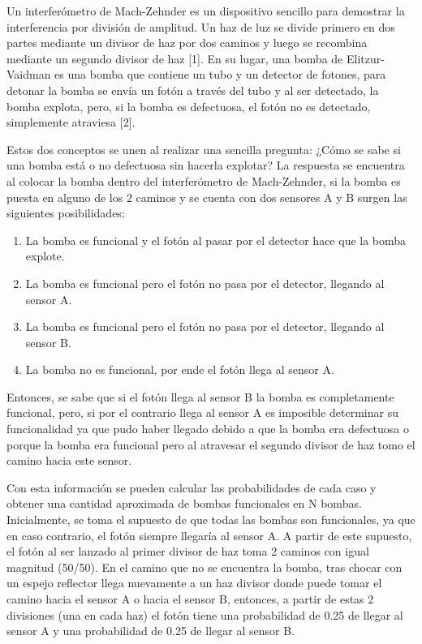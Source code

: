 \documentclass[conference]{IEEEtran}
\begin{document}
Un interferómetro de Mach-Zehnder es un dispositivo sencillo para demostrar la interferencia por división de amplitud. Un haz de luz se divide primero en dos partes 
mediante un divisor de haz por dos caminos y luego se recombina mediante un segundo divisor de haz [1]. En su lugar, una bomba de Elitzur-Vaidman es una bomba que contiene un tubo y 
un detector de fotones, para detonar la bomba se envía un fotón a través del tubo y al ser detectado, la bomba explota, pero, si la bomba es defectuosa, el fotón no es
detectado, simplemente atraviesa [2].

Estos dos conceptos se unen al realizar una sencilla pregunta: ¿Cómo se sabe si una bomba está o no defectuosa sin hacerla explotar? La respuesta se encuentra
al colocar la bomba dentro del interferómetro de Mach-Zehnder, si la bomba es puesta en alguno de los 2 caminos y se cuenta con dos sensores A y B surgen las siguientes posibilidades:
\begin{enumerate}
    \item La bomba es funcional y el fotón al pasar por el detector hace que la bomba explote.
    \item La bomba es funcional pero el fotón no pasa por el detector, llegando al sensor A.
    \item La bomba es funcional pero el fotón no pasa por el detector, llegando al sensor B.
    \item La bomba no es funcional, por ende el fotón llega al sensor A.
\end{enumerate}
Entonces, se sabe que si el fotón llega al sensor B la bomba es completamente funcional, pero, si por el contrario llega al sensor A es imposible determinar su funcionalidad
ya que pudo haber llegado debido a que la bomba era defectuosa o porque la bomba era funcional pero al atravesar el segundo divisor de haz tomo el camino
hacia este sensor.

Con esta información se pueden calcular las probabilidades de cada caso y obtener una cantidad aproximada de bombas funcionales en N bombas. Inicialmente, se toma el supuesto
de que todas las bombas son funcionales, ya que en caso contrario, el fotón siempre llegaría al sensor A. A partir de este supuesto, el fotón al ser lanzado al primer divisor de haz
toma 2 caminos con igual magnitud (50/50). En el camino que no se encuentra la bomba, tras chocar con un espejo reflector llega nuevamente a un haz divisor donde puede tomar el camino
hacia el sensor A o hacia el sensor B, entonces, a partir de estas 2 divisiones (una en cada haz) el fotón tiene una probabilidad de 0.25 de llegar al sensor A y una probabilidad de 
0.25 de llegar al sensor B.
\end{document}
